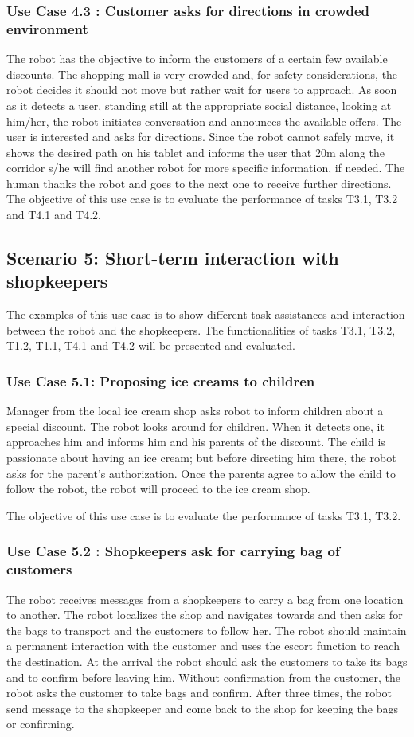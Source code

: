\subsubsection*{Use Case 4.3 : Customer asks for directions in crowded environment} The robot has the objective to inform the customers of a certain few
available discounts. The shopping mall is very crowded and, for safety
considerations, the robot decides it should not move but rather wait
for users to approach. As soon as it detects a user, standing still at
the appropriate social distance, looking at him/her, the robot initiates
conversation and announces the available offers. The user is interested
and asks for directions. Since the robot cannot safely move, it shows
the desired path on his tablet and informs the user that 20m along
the corridor s/he will find another robot for more specific information,
if needed. The human thanks the robot and goes to the next one to
receive further directions.
The objective of this use case is to evaluate the performance of tasks T3.1, T3.2 and T4.1 and T4.2.

\subsection{Scenario 5: Short-term interaction with shopkeepers}
The examples of this use case is to show different task assistances and interaction between the robot and the shopkeepers. The functionalities of tasks T3.1, T3.2, T1.2, T1.1, T4.1 and T4.2 will be presented and evaluated. 


\subsubsection*{Use Case 5.1: Proposing ice creams to children} 
Manager from the local ice cream shop asks robot to inform children about
a special discount. The robot looks around for children. When it detects
one, it approaches him and informs him and his parents of the discount. The child
is passionate about having an ice cream; but before directing him
there, the robot asks for the parent's authorization. Once the parents
agree to allow the child to follow the robot, the robot will proceed
to the ice cream shop. 

The objective of this use case is to evaluate the performance of tasks T3.1, T3.2.

\subsubsection*{Use Case 5.2 : Shopkeepers ask for carrying bag of customers}
The robot receives messages from a shopkeepers to carry a bag from one location to another. The robot localizes the shop and navigates towards and then asks for the bags to transport and the customers to follow her. The robot should maintain a permanent interaction with the customer and uses the escort function to reach the destination. At the arrival the robot should ask the customers to take its bags and to confirm before leaving him. Without confirmation from the customer, the robot asks the customer to take bags and confirm. After three times, the robot send message to the shopkeeper and come back to the shop for keeping the bags or confirming.


